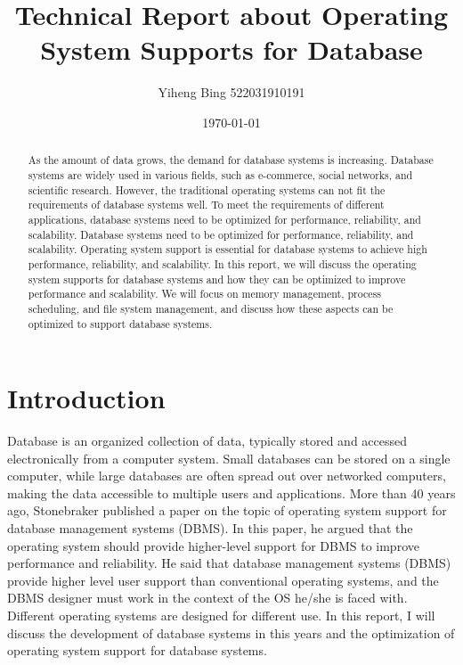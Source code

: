 \documentclass[11pt,a4paper]{article}
\title{Technical Report about Operating System Supports for Database}
\author{Yiheng Bing  522031910191}
\date{\today}
\begin{document}
\maketitle

\fontsize{10pt}{12pt}


\begin{abstract}
As the amount of data grows, the demand for database systems is increasing. 
Database systems are widely used in various fields, such as e-commerce, social networks, and scientific research.
However, the traditional operating systems can not fit the requirements of database systems well.
To meet the requirements of different applications, database systems need to be optimized for performance, reliability, and scalability. 
Database systems need to be optimized for performance, reliability, and scalability.
Operating system support is essential for database systems to achieve high performance, reliability, and scalability.
In this report, we will discuss the operating system supports for database systems and how they can be optimized to improve performance and scalability.
We will focus on memory management, process scheduling, and file system management, and discuss how these aspects can be optimized to support database systems.
\end{abstract}

\tableofcontents
\newpage


\section{Introduction}
Database is an organized collection of data, typically stored and accessed electronically from a computer system. 
Small databases can be stored on a single computer, while large databases are often spread out over networked computers, making the data accessible to multiple users and applications.
More than 40 years ago, Stonebraker published a paper on the topic of operating system support for database management systems (DBMS).
In this paper, he argued that the operating system should provide higher-level support for DBMS to improve performance and reliability.
He said that database management systems (DBMS) provide higher level user support than conventional operating systems, 
and the DBMS designer must work in the context of the OS he/she is faced with. 
Different operating systems are designed for different use.  \cite{10.1145/358699.358703}
In this report, I will discuss the development of database systems in this years and the optimization of operating system support for database systems.
\end{document}
